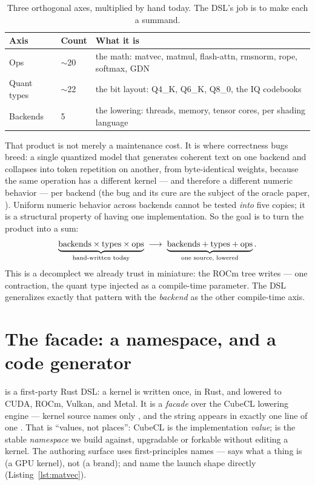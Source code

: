 \documentclass[11pt]{article}
\begin{document}
\begin{table}[h]
\centering
\begin{tabular}{lll}
\toprule
\textbf{Axis} & \textbf{Count} & \textbf{What it is} \\
\midrule
Ops        & $\sim$20 & the math: matvec, matmul, flash-attn, rmsnorm, rope, softmax, GDN \\
Quant types & $\sim$22 & the bit layout: Q4\_K, Q6\_K, Q8\_0, the IQ codebooks \\
Backends   & 5        & the lowering: threads, memory, tensor cores, per shading language \\
\bottomrule
\end{tabular}
\caption{Three orthogonal axes, multiplied by hand today. The DSL's job is to make each a summand.}
\label{tab:axes}
\end{table}

That product is not merely a maintenance cost. It is where correctness bugs breed: a single quantized
model that generates coherent text on one backend and collapses into token repetition on another, from
byte-identical weights, because the same operation has a different kernel --- and therefore a different
numeric behavior --- per backend (the bug and its cure are the subject of the oracle paper,
\cite{oracle}). Uniform numeric behavior across backends cannot be tested \emph{into} five copies; it is a
structural property of having one implementation. So the goal is to turn the product into a sum:
\[
\underbrace{\text{backends} \times \text{types} \times \text{ops}}_{\text{hand-written today}}
\;\longrightarrow\;
\underbrace{\text{backends} + \text{types} + \text{ops}}_{\text{one source, lowered}}.
\]
This is a decomplect we already trust in miniature: the ROCm tree writes  --- one
contraction, the quant type injected as a compile-time parameter. The DSL generalizes exactly that pattern
with the \emph{backend} as the other compile-time axis.

\section{The facade: a namespace, and a code generator}
\label{sec:facade}

\hk{} is a first-party Rust DSL: a kernel is written once, in Rust, and lowered to CUDA, ROCm, Vulkan, and
Metal. It is a \emph{facade} over the CubeCL lowering engine --- kernel source names only
, and the string  appears in exactly one line of one .
That is ``values, not places'': CubeCL is the implementation \emph{value}; \hk{} is the stable
\emph{namespace} we build against, upgradable or forkable without editing a kernel. The authoring surface
uses first-principles names --- \code{\#[kernel]} says what a thing is (a GPU kernel), not  (a
brand);  and  name the launch shape directly (Listing~\ref{lst:matvec}).
\end{document}
